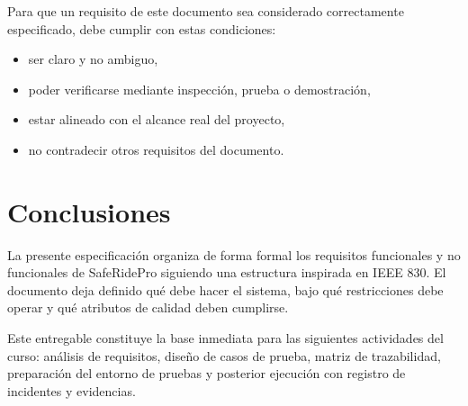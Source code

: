 \documentclass[12pt]{article}
\begin{document}
Para que un requisito de este documento sea considerado correctamente especificado, debe cumplir con estas condiciones:

\begin{itemize}[leftmargin=1.2cm]
    \item ser claro y no ambiguo,
    \item poder verificarse mediante inspecci\'on, prueba o demostraci\'on,
    \item estar alineado con el alcance real del proyecto,
    \item no contradecir otros requisitos del documento.
\end{itemize}

\section{Conclusiones}

La presente especificaci\'on organiza de forma formal los requisitos funcionales y no funcionales de SafeRidePro siguiendo una estructura inspirada en IEEE 830. El documento deja definido qu\'e debe hacer el sistema, bajo qu\'e restricciones debe operar y qu\'e atributos de calidad deben cumplirse.

Este entregable constituye la base inmediata para las siguientes actividades del curso: an\'alisis de requisitos, dise\~no de casos de prueba, matriz de trazabilidad, preparaci\'on del entorno de pruebas y posterior ejecuci\'on con registro de incidentes y evidencias.

\nocite{ieee830,saferideReqBase,saferideProtocol,saferidePolicies,saferideHandoff}


\end{document}
